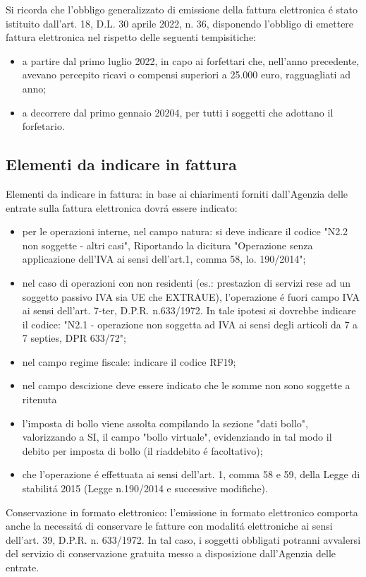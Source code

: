 \documentclass{article}
\begin{document}
Si ricorda che l'obbligo generalizzato di emissione della fattura elettronica \'e stato istituito dall'art. 18, D.L. 30 aprile 2022, n. 36, disponendo l'obbligo di emettere fattura elettronica nel rispetto delle seguenti tempisitiche:
\begin{itemize}
    \item a partire dal primo luglio 2022, in capo ai forfettari che, nell'anno precedente, avevano percepito ricavi o compensi superiori a 25.000 euro, ragguagliati ad anno;
    \item a decorrere dal primo gennaio 20204, per tutti i soggetti che adottano il forfetario.
\end{itemize}

\subsection{Elementi da indicare in fattura}
Elementi da indicare in fattura: in base ai chiarimenti forniti dall'Agenzia delle entrate sulla fattura elettronica dovr\'a essere indicato:
\begin{itemize}
    \item per le operazioni interne, nel campo natura: si deve indicare il codice "N2.2 non soggette - altri casi", Riportando la dicitura "Operazione senza applicazione dell'IVA ai sensi dell'art.1, comma 58, lo. 190/2014";
    \item nel caso di operazioni con non residenti (es.: prestazion di servizi rese ad un soggetto passivo IVA sia UE che EXTRAUE), l'operazione \'e fuori campo IVA ai sensi dell'art. 7-ter, D.P.R. n.633/1972. In tale ipotesi si dovrebbe indicare il codice: "N2.1 - operazione non soggetta ad IVA ai sensi degli articoli da 7 a 7 septies, DPR 633/72";
    \item nel campo regime fiscale: indicare il codice RF19;
    \item nel campo descizione deve essere indicato che le somme non sono soggette a ritenuta
    \item l'imposta di bollo viene assolta compilando la sezione "dati bollo", valorizzando a SI, il campo "bollo virtuale", evidenziando in tal modo il debito per imposta di bollo (il riaddebito \'e facoltativo);
    \item che l'operazione \'e effettuata ai sensi dell'art. 1, comma 58 e 59, della Legge di stabilit\'a 2015 (Legge n.190/2014 e successive modifiche).
\end{itemize}

Conservazione in formato elettronico: l'emissione in formato elettronico comporta anche la necessit\'a di conservare le fatture con modalit\'a elettroniche ai sensi dell'art. 39, D.P.R. n. 633/1972. In tal caso, i soggetti obbligati potranni avvalersi del servizio di conservazione gratuita messo a disposizione dall'Agenzia delle entrate. 
\end{document}

